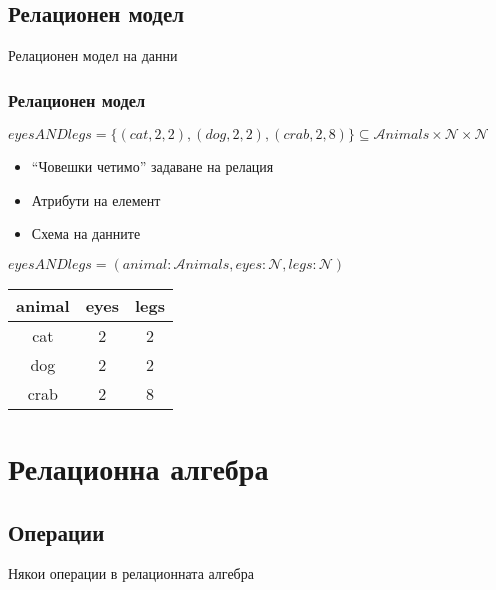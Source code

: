 \documentclass{beamer}
\begin{document}
\subsection{Релационен модел}
\begin{frame}
\centerline{Релационен модел на данни}
\end{frame}

\begin{frame}[fragile]
\frametitle{Релационен модел}

$eyesANDlegs=\{(cat,2,2),(dog,2,2),(crab,2,8)\} \subseteq \mathcal{A}nimals \times \mathcal{N} \times \mathcal{N}$

\vspace{1em}

\begin{itemize}
  \item ``Човешки четимо'' задаване на релация
  \item Атрибути на елемент
  \item Схема на данните
\end{itemize}

\vspace{1em}

$eyesANDlegs=(animal:\mathcal{A}nimals,eyes:\mathcal{N},legs:\mathcal{N})$

\pause


\begin{center}
  
\begin{tabular}{ c | c | c }
  
  animal  & eyes  & legs \\ \hline  
  cat  & 2  & 2 \\
  dog & 2 & 2 \\
  crab & 2 & 8 \\
  
\end{tabular} 

\end{center}


\end{frame}

\section{Релационна алгебра}
\subsection{Операции}


\begin{frame}
\centerline{Някои операции в релационната алгебра}
\end{frame}
\end{document}
